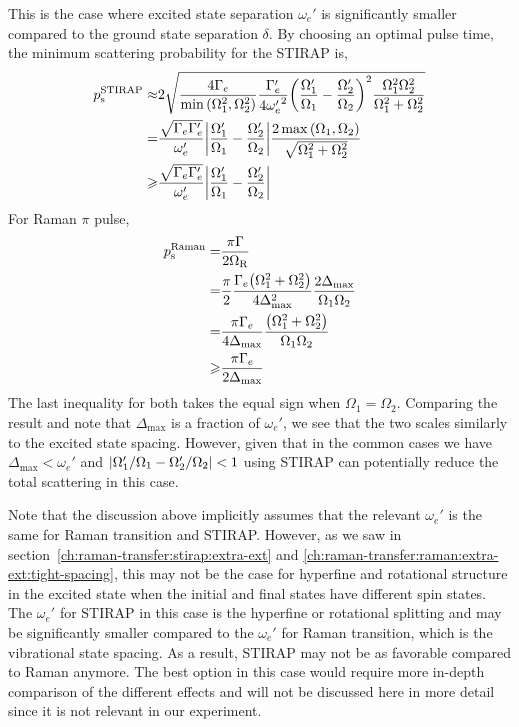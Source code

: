 This is the case where excited state separation $\omega_e'$ is significantly smaller compared
to the ground state separation $\delta$.
By choosing an optimal pulse time, the minimum scattering probability for the STIRAP is,
\begin{align*}
  p_{\mathrm{s}}^{\mathrm{STIRAP}}\approx&2\sqrt{\frac{4\Gamma_e}{\min{\left({\Omega_1^2, \Omega_2^2}\right)}}\frac{\Gamma'_e}{4{\omega'_e}^2}{\left({\frac{\Omega'_1}{\Omega_1}-\frac{\Omega'_2}{\Omega_2}}\right)}^2\frac{\Omega_1^2\Omega_2^2}{\Omega_1^2+\Omega_2^2}}\\
  =&\frac{\sqrt{\Gamma_e\Gamma'_e}}{\omega'_e}
     {\left|{\frac{\Omega'_1}{\Omega_1}-\frac{\Omega'_2}{\Omega_2}}\right|}
     \frac{2\max{\left({\Omega_1, \Omega_2}\right)}}{\sqrt{\Omega_1^2+\Omega_2^2}}\\
  \geqslant&\frac{\sqrt{\Gamma_e\Gamma'_e}}{\omega'_e}
             {\left|{\frac{\Omega'_1}{\Omega_1}-\frac{\Omega'_2}{\Omega_2}}\right|}
\end{align*}
For Raman $\pi$ pulse,
\begin{align*}
  p_{\mathrm{s}}^{\mathrm{Raman}}=&\frac{\pi\Gamma}{2\Omega_{\mathrm{R}}}\\
  =&\frac{\pi}{2}\frac{\Gamma_e{\left({\Omega_1^2+\Omega_2^2}\right)}}{4\Delta_{\max}^2}
     \frac{2\Delta_{\max}}{\Omega_1\Omega_2}\\
  =&\frac{\pi\Gamma_e}{4\Delta_{\max}}\frac{{\left({\Omega_1^2+\Omega_2^2}\right)}}{\Omega_1\Omega_2}\\
  \geqslant&\frac{\pi\Gamma_e}{2\Delta_{\max}}
\end{align*}
The last inequality for both takes the equal sign when $\Omega_1=\Omega_2$.
Comparing the result and note that $\Delta_{\max}$ is a fraction of $\omega_e'$,
we see that the two scales similarly to the excited state spacing.
However, given that in the common cases we have $\Delta_{\max}<\omega_e'$ and
${\left|{\Omega'_1/\Omega_1-\Omega'_2/\Omega_2}\right|}<1$ using STIRAP can potentially reduce
the total scattering in this case.

Note that the discussion above implicitly assumes that the relevant $\omega_e'$
is the same for Raman transition and STIRAP.
However, as we saw in section~\ref{ch:raman-transfer:stirap:extra-ext} and
\ref{ch:raman-transfer:raman:extra-ext:tight-spacing},
this may not be the case for hyperfine and rotational structure
in the excited state when the initial and final states have different spin states.
The $\omega_e'$ for STIRAP in this case is the hyperfine or rotational splitting
and may be significantly smaller compared to the $\omega_e'$ for Raman transition,
which is the vibrational state spacing.
As a result, STIRAP may not be as favorable compared to Raman anymore.
The best option in this case would require more in-depth comparison
of the different effects and will not be discussed here in more detail
since it is not relevant in our experiment.

